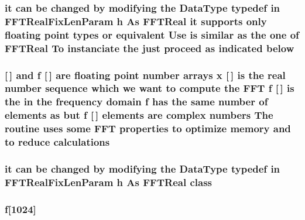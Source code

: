 \subsubsection[{\texorpdfstring{below}{below}}]{\setlength{\rightskip}{0pt plus 5cm}it can be changed by modifying the Data\+Type typedef in F\+F\+T\+Real\+Fix\+Len\+Param {\bf h} As {\bf F\+F\+T\+Real} it supports only floating point types or equivalent Use is similar as the one of {\bf F\+F\+T\+Real} To instanciate the just proceed as indicated below}\hypertarget{FFTReal__readme_8txt_aadd6d22385a49baac7311a220729ab52}{}\label{FFTReal__readme_8txt_aadd6d22385a49baac7311a220729ab52}
\subsubsection[{\texorpdfstring{calculations}{calculations}}]{ \mbox{[}$\,$\mbox{]} and {\bf f} \mbox{[}$\,$\mbox{]} are floating point number arrays {\bf x} \mbox{[}$\,$\mbox{]} is the real number sequence which we want to compute the F\+FT {\bf f} \mbox{[}$\,$\mbox{]} is the in the frequency domain {\bf f} has the same number of elements as but {\bf f} \mbox{[}$\,$\mbox{]} elements are complex numbers The routine uses some F\+FT properties to optimize memory and to reduce calculations}\hypertarget{FFTReal__readme_8txt_a65cbf8e61482778d7aa2ebe890cc7d7c}{}\label{FFTReal__readme_8txt_a65cbf8e61482778d7aa2ebe890cc7d7c}
\subsubsection[{\texorpdfstring{class}{class}}]{\setlength{\rightskip}{0pt plus 5cm}it can be changed by modifying the Data\+Type typedef in F\+F\+T\+Real\+Fix\+Len\+Param {\bf h} As {\bf F\+F\+T\+Real} class}\hypertarget{FFTReal__readme_8txt_ad229ab5c8241df85a2096743cc8c4e9f}{}\label{FFTReal__readme_8txt_ad229ab5c8241df85a2096743cc8c4e9f}
\subsubsection[{\texorpdfstring{f}{f}}]{ f\mbox{[}1024\mbox{]}}\hypertarget{FFTReal__readme_8txt_abbf3cc73d1e3e4714ab1639819396eca}{}\label{FFTReal__readme_8txt_abbf3cc73d1e3e4714ab1639819396eca}
